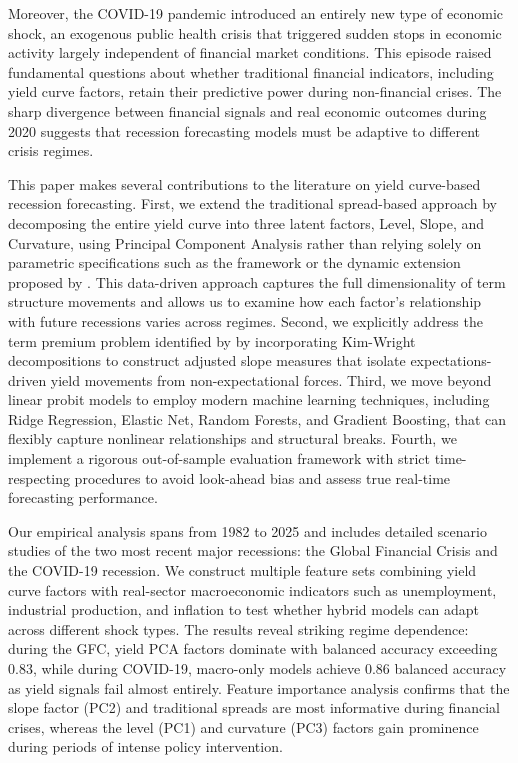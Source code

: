 Moreover, the COVID-19 pandemic introduced an entirely new type of economic shock, an exogenous public health crisis that triggered sudden stops in economic activity largely independent of financial market conditions. This episode raised fundamental questions about whether traditional financial indicators, including yield curve factors, retain their predictive power during non-financial crises. The sharp divergence between financial signals and real economic outcomes during 2020 suggests that recession forecasting models must be adaptive to different crisis regimes.

This paper makes several contributions to the literature on yield curve-based recession forecasting. First, we extend the traditional spread-based approach by decomposing the entire yield curve into three latent factors, Level, Slope, and Curvature, using Principal Component Analysis rather than relying solely on parametric specifications such as the \citet{nelsonParsimoniousModelingYield1987} framework or the dynamic extension proposed by \citet{diebold2006forecasting}. This data-driven approach captures the full dimensionality of term structure movements and allows us to examine how each factor's relationship with future recessions varies across regimes. Second, we explicitly address the term premium problem identified by \citet{rudebusch2006macroeconomic} by incorporating Kim-Wright decompositions to construct adjusted slope measures that isolate expectations-driven yield movements from non-expectational forces. Third, we move beyond linear probit models to employ modern machine learning techniques, including Ridge Regression, Elastic Net, Random Forests, and Gradient Boosting, that can flexibly capture nonlinear relationships and structural breaks. Fourth, we implement a rigorous out-of-sample evaluation framework with strict time-respecting procedures to avoid look-ahead bias and assess true real-time forecasting performance.

Our empirical analysis spans from 1982 to 2025 and includes detailed scenario studies of the two most recent major recessions: the Global Financial Crisis and the COVID-19 recession. We construct multiple feature sets combining yield curve factors with real-sector macroeconomic indicators such as unemployment, industrial production, and inflation to test whether hybrid models can adapt across different shock types. The results reveal striking regime dependence: during the GFC, yield PCA factors dominate with balanced accuracy exceeding 0.83, while during COVID-19, macro-only models achieve 0.86 balanced accuracy as yield signals fail almost entirely. Feature importance analysis confirms that the slope factor (PC2) and traditional spreads are most informative during financial crises, whereas the level (PC1) and curvature (PC3) factors gain prominence during periods of intense policy intervention.

